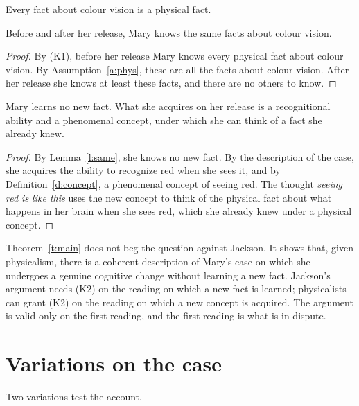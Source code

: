 \documentclass{situationist-preprint}
\begin{document}
\begin{assumption}[Physicalism]\label{a:phys}
Every fact about colour vision is a physical fact.
\end{assumption}

\begin{lemma}\label{l:same}
Before and after her release, Mary knows the same facts about colour vision.
\end{lemma}

\begin{proof}
By (K1), before her release Mary knows every physical fact about colour vision. By Assumption~\ref{a:phys}, these are all the facts about colour vision. After her release she knows at least these facts, and there are no others to know.
\end{proof}

\begin{theorem}\label{t:main}
Mary learns no new fact. What she acquires on her release is a recognitional ability and a phenomenal concept, under which she can think of a fact she already knew.
\end{theorem}

\begin{proof}
By Lemma~\ref{l:same}, she knows no new fact. By the description of the case, she acquires the ability to recognize red when she sees it, and by Definition~\ref{d:concept}, a phenomenal concept of seeing red. The thought \emph{seeing red is like this} uses the new concept to think of the physical fact about what happens in her brain when she sees red, which she already knew under a physical concept.
\end{proof}

Theorem~\ref{t:main} does not beg the question against Jackson. It shows that, given physicalism, there is a coherent description of Mary's case on which she undergoes a genuine cognitive change without learning a new fact. Jackson's argument needs (K2) on the reading on which a new fact is learned; physicalists can grant (K2) on the reading on which a new concept is acquired. The argument is valid only on the first reading, and the first reading is what is in dispute.

\section{Variations on the case}

Two variations test the account.
\end{document}
